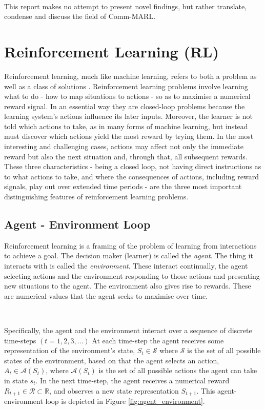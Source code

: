 \documentclass{article}
\begin{document}
\

This report makes no attempt to present novel findings, but rather translate, condense and discuss the field of Comm-MARL. 

\newpage

\section{Reinforcement Learning (RL)} \label{sec:rl}

Reinforcement learning, much like machine learning, refers to both a problem as well as a class of solutions \citep{sutton2018reinforcement}. Reinforcement learning problems involve learning what to do - how to map situations to actions - so as to maximise a numerical reward signal. In an essential way they are closed-loop problems because the learning system’s actions influence its later inputs. Moreover, the learner is not told which actions to take, as in many forms of machine learning, but instead must discover which actions yield the most reward by trying them. In the most interesting and challenging cases, actions may affect not only the immediate reward but also the next situation and, through that, all subsequent rewards. These three characteristics - being a closed loop, not having direct instructions as to what actions to take, and where the consequences of actions, including reward signals, play out over extended time periods - are the three most important distinguishing features of reinforcement learning problems.


\subsection{Agent - Environment Loop}

Reinforcement learning is a framing of the problem of learning from interactions to achieve a goal. The decision maker (learner) is called the \textit{agent}. The thing it interacts with is called the \textit{environment}. These interact continually, the agent selecting actions and the environment responding to those actions and presenting new situations to the agent. The environment also gives rise to rewards. These are numerical values that the agent seeks to maximise over time.

\

Specifically, the agent and the environment interact over a sequence of discrete time-steps $(t = 1, 2, 3, \hdots)$ At each time-step the agent receives some representation of the environment's state, $S_t \in \mathcal{S}$ where $\mathcal{S}$ is the set of all possible states of the environment, based on that the agent selects an action, $A_t \in \mathcal{A}(S_t)$, where $\mathcal{A}(S_t)$ is the set of all possible actions the agent can take in state $s_t$. In the next time-step, the agent receives a numerical reward $R_{t+1} \in \mathcal{R} \subset \mathbb{R}$, and observes a new state representation $S_{t+1}$. This agent-environment loop is depicted in Figure \ref{fig:agent_environment}.
\end{document}
